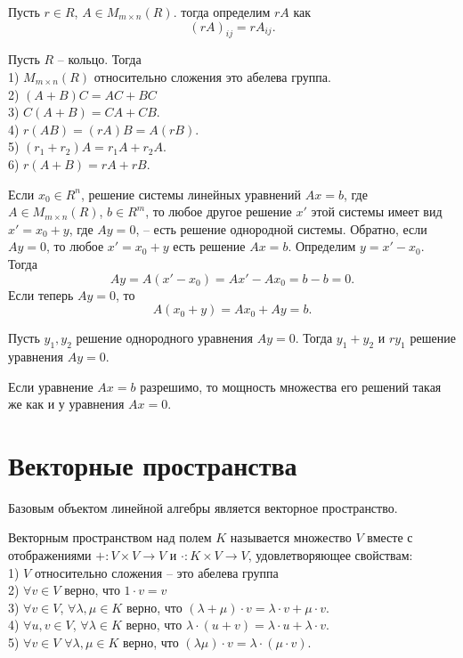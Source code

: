 \dfn Пусть $r\in R$, $A\in M_{m\times n}(R)$. тогда определим $rA$ как 
$$(rA)_{ij}=rA_{ij}.$$
\edfn

\utv Пусть $R$ -- кольцо. Тогда\\
1) $M_{m\times n}(R)$ относительно сложения это абелева группа.\\
2) $(A+B)C=AC+BC$\\
3) $C(A+B)=CA+CB$.\\
4) $r(AB)=(rA)B=A(rB)$.\\
5) $(r_1+r_2)A=r_1A+r_2A$.\\
6) $r(A+B)=rA+rB$.
\eutv

\crl Если $x_0\in R^n$, решение системы линейных уравнений $Ax=b$, где $A\in M_{m\times n}(R)$, $b\in R^m$, то любое другое решение $x'$ этой системы имеет вид $x'=x_0+y$, где $Ay=0$, -- есть решение однородной системы. Обратно, если $Ay=0$, то любое $x'=x_0+y$ есть решение  $Ax=b$.
\proof Определим $y=x'-x_0$. Тогда $$Ay=A(x'-x_0)=Ax'-Ax_0=b-b=0.$$
Если теперь $Ay=0$, то 
$$A(x_0+y)=Ax_0+Ay=b.$$

\endproof
\ecrl

\crl Пусть $y_1,y_2$ решение однородного уравнения $Ay=0$. Тогда $y_1+y_2$  и $ry_1$ решение уравнения $Ay=0$.
\ecrl

\crl Если уравнение $Ax=b$ разрешимо, то мощность множества его решений такая же как и у уравнения $Ax=0$. 
\ecrl





\section{Векторные пространства}

Базовым объектом линейной алгебры является векторное пространство.

Векторным пространством над полем $K$ называется множество $V$ вместе с отображениями $+\colon V\times V \to V$ и $\cdot \colon K \times V \to V$, удовлетворяющее свойствам:\\
1) $V$ относительно сложения -- это абелева группа\\
2) $\forall v \in V$ верно, что $1\cdot v=v$\\
3) $\forall v \in V$, $\forall \lambda, \mu \in K$ верно, что $(\lambda+\mu)\cdot v= \lambda\cdot v + \mu \cdot v$.\\
4) $\forall u,v \in V$, $\forall \lambda \in K$ верно, что $\lambda\cdot(u+v)= \lambda\cdot u + \lambda \cdot v$.\\
5) $\forall v \in V$ $\forall \lambda, \mu \in K$ верно, что $(\lambda\mu)\cdot v= \lambda\cdot(\mu \cdot v)$.
\edfn





